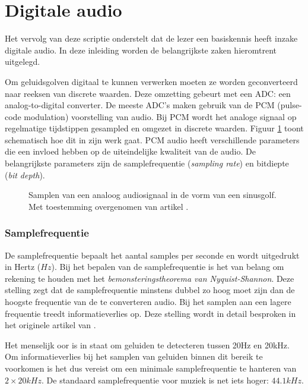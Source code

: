 \section{Digitale audio}

Het vervolg van deze scriptie onderstelt dat de lezer een basiskennis heeft inzake digitale audio. In deze inleiding worden de belangrijkste zaken hieromtrent uitgelegd.

Om geluidsgolven digitaal te kunnen verwerken moeten ze worden geconverteerd naar reeksen van discrete waarden. Deze omzetting gebeurt met een ADC: een analog-to-digital converter. De meeste ADC's maken gebruik van de PCM (pulse-code modulation) voorstelling van audio. Bij PCM wordt het analoge signaal op regelmatige tijdstippen gesampled en omgezet in discrete waarden. Figuur \ref{sampling} toont schematisch hoe dit in zijn werk gaat. PCM audio heeft verschillende parameters die een invloed hebben op de uiteindelijke kwaliteit van de audio. De belangrijkste parameters zijn de samplefrequentie (\textit{sampling rate}) en bitdiepte (\textit{bit depth}).

\begin{figure}[h!]
	\captionsetup{width=0.7\textwidth}
	\caption[Samplen van audio]{Samplen van een analoog audiosignaal in de vorm van een sinusgolf. Met toestemming overgenomen van artikel \cite{tarsosmanual2016}.}
	\begin{center}
		\advance\parskip0.3cm
		
	\end{center}
	\label{sampling}
\end{figure}

\subsubsection{Samplefrequentie}

De samplefrequentie bepaalt het aantal samples per seconde en wordt uitgedrukt in Hertz ($Hz$). Bij het bepalen van de samplefrequentie is het van belang om rekening te houden met het \textit{bemonsteringstheorema van Nyquist-Shannon}. Deze stelling zegt dat de samplefrequentie minstens dubbel zo hoog moet zijn dan de hoogste frequentie van de te converteren audio. Bij het samplen aan een lagere frequentie treedt informatieverlies op. Deze stelling wordt in detail besproken in het originele artikel \cite{nyquist1928certain} van \citeauthor{nyquist1928certain}.

Het menselijk oor is in staat om geluiden te detecteren tussen 20Hz en 20kHz. Om informatieverlies bij het samplen van geluiden binnen dit bereik te voorkomen is het dus vereist om een minimale samplefrequentie te hanteren van $ 2 \times 20kHz $. De standaard samplefrequentie voor muziek is net iets hoger: $ 44.1kHz $.

